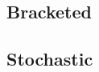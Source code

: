 \subsection{Bracketed \lsystems}

\subsection{Stochastic \lsystems}







































